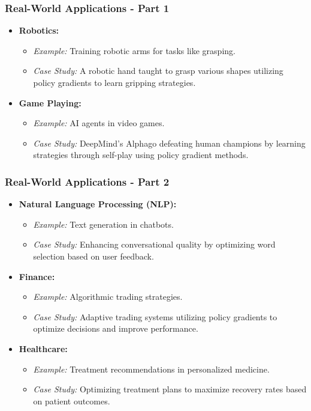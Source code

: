 \documentclass[aspectratio=169]{beamer}
\begin{document}
\begin{frame}[fragile]
    \frametitle{Real-World Applications - Part 1}
    \begin{itemize}
        \item \textbf{Robotics:} 
        \begin{itemize}
            \item \textit{Example:} Training robotic arms for tasks like grasping.
            \item \textit{Case Study:} A robotic hand taught to grasp various shapes utilizing policy gradients to learn gripping strategies.
        \end{itemize}

        \item \textbf{Game Playing:}
        \begin{itemize}
            \item \textit{Example:} AI agents in video games.
            \item \textit{Case Study:} DeepMind's Alphago defeating human champions by learning strategies through self-play using policy gradient methods.
        \end{itemize}
    \end{itemize}
\end{frame}

\begin{frame}[fragile]
    \frametitle{Real-World Applications - Part 2}
    \begin{itemize}
        \item \textbf{Natural Language Processing (NLP):}
        \begin{itemize}
            \item \textit{Example:} Text generation in chatbots.
            \item \textit{Case Study:} Enhancing conversational quality by optimizing word selection based on user feedback.
        \end{itemize}

        \item \textbf{Finance:}
        \begin{itemize}
            \item \textit{Example:} Algorithmic trading strategies.
            \item \textit{Case Study:} Adaptive trading systems utilizing policy gradients to optimize decisions and improve performance.
        \end{itemize}

        \item \textbf{Healthcare:}
        \begin{itemize}
            \item \textit{Example:} Treatment recommendations in personalized medicine.
            \item \textit{Case Study:} Optimizing treatment plans to maximize recovery rates based on patient outcomes.
        \end{itemize}
    \end{itemize}
\end{frame}
\end{document}

